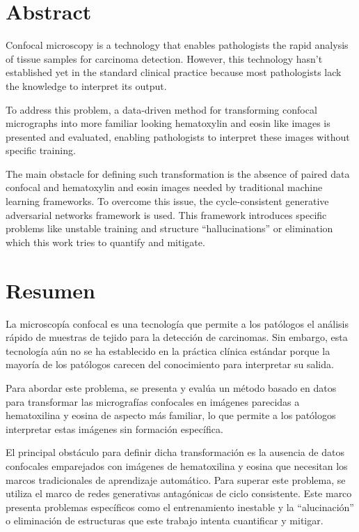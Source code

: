 \documentclass[a4paper,12pt,titlepage]{article}
\begin{document}
\section*{Abstract}
Confocal microscopy is a technology that enables pathologists the rapid
analysis of tissue samples for carcinoma detection.
However, this technology hasn't established yet in the standard clinical
practice because most pathologists lack the knowledge to interpret its output.

To address this problem, a data-driven method for transforming confocal
micrographs into
more familiar looking hematoxylin and eosin like images is presented and
evaluated, enabling
pathologists to interpret these images without specific training.

The main obstacle for defining such transformation is the absence of
paired data confocal and hematoxylin and eosin images needed by traditional
machine learning frameworks.
To overcome this issue, the cycle-consistent generative adversarial networks
framework is used.
This framework introduces specific problems like unstable training and structure
``hallucinations'' or elimination which this work tries to quantify and mitigate.

\thispagestyle{empty}

\section*{Resumen}
La microscopía confocal es una tecnología que permite a los patólogos el análisis rápido de muestras de tejido para la detección de carcinomas. Sin embargo, esta tecnología aún no se ha establecido en la práctica clínica estándar porque la mayoría de los patólogos carecen del conocimiento para interpretar su salida.

Para abordar este problema, se presenta y evalúa un método basado en datos para transformar las micrografías confocales en imágenes parecidas a hematoxilina y eosina de aspecto más familiar, lo que permite a los patólogos interpretar estas imágenes sin formación específica.

El principal obstáculo para definir dicha transformación es la ausencia de datos confocales emparejados con imágenes de hematoxilina y eosina que necesitan los marcos tradicionales de aprendizaje automático. Para superar este problema, se utiliza el marco de redes generativas antagónicas de ciclo consistente.
Este marco presenta problemas específicos como el entrenamiento inestable y la ``alucinación'' o eliminación de estructuras que este trabajo intenta cuantificar y mitigar.
\end{document}
